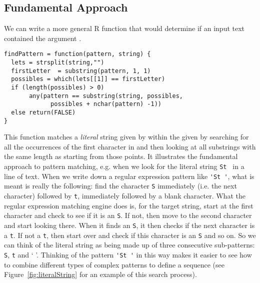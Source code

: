 \subsection{Fundamental Approach}
We can write a more general R function that would determine if an input text
contained the argument .
{\footnotesize{
\begin{verbatim}
findPattern = function(pattern, string) {
  lets = strsplit(string,"")   
  firstLetter  = substring(pattern, 1, 1)
  possibles = which(lets[[1]] == firstLetter)
  if (length(possibles) > 0)
       any(pattern == substring(string, possibles, 
             possibles + nchar(pattern) -1))
  else return(FALSE)
}
\end{verbatim}
}}
\noindent 
This function matches a \textit{literal} string given by
 within the given  by searching
for all the occurrences of the first character in 
and then looking at all substrings with the same length as
 starting from those points.  It illustrates the
fundamental approach to pattern matching, e.g. when we look for the
literal string \verb+St + in a line of text.  When we write down a
regular expression pattern like \verb+'St '+, what is meant is really
the following: find the character \verb+S+ immediately (i.e. the next
character) followed by \verb+t+, immediately followed by a blank
character.  What the regular expression matching engine does is, for
the target string, start at the first character and check to see if it
is an \verb+S+. If not, then move to the second character and start looking
there.  When it finds an \verb+S+, it then checks if the next character is
a \verb+t+. If not a \verb+t+, then start over and check if this character is
an \verb+S+ and so on.  So we can think of the literal string as being made
up of three consecutive sub-patterns: \verb+S+, \verb+t+ and ` '.  Thinking of
the pattern \verb+'St '+ in this way makes it easier to see how to combine
different types of complex patterns to define a sequence (see
Figure~\ref{fig:literalString} for an example of this search process).


